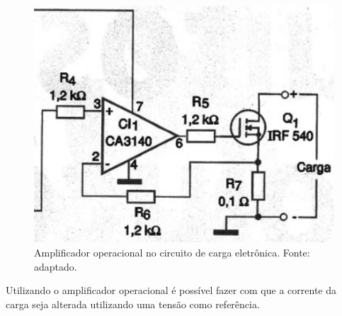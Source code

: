 \FloatBarrier
\begin{figure}[!htbp]
	\centering
	\includegraphics[scale=0.7]{imagens/CEAMP}
	\caption{Amplificador operacional no circuito de carga eletrônica. Fonte:  adaptado.}
	\label{fig:CEAMP}
\end{figure}
\FloatBarrier

Utilizando o amplificador operacional é possível fazer com que a corrente da carga seja alterada utilizando uma tensão como referência.


